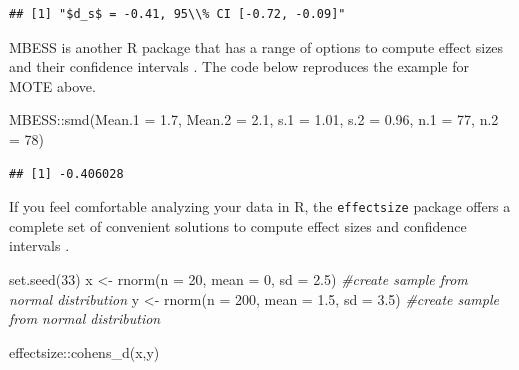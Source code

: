 \documentclass[
]{krantz}
\newenvironment{Shaded}{\begin{snugshade}}{\end{snugshade}}
\newcommand{\AttributeTok}[1]{\textcolor[rgb]{0.77,0.63,0.00}{#1}}
\newcommand{\CommentTok}[1]{\textcolor[rgb]{0.56,0.35,0.01}{\textit{#1}}}
\newcommand{\DecValTok}[1]{\textcolor[rgb]{0.00,0.00,0.81}{#1}}
\newcommand{\FloatTok}[1]{\textcolor[rgb]{0.00,0.00,0.81}{#1}}
\newcommand{\FunctionTok}[1]{\textcolor[rgb]{0.00,0.00,0.00}{#1}}
\newcommand{\NormalTok}[1]{#1}
\newcommand{\OtherTok}[1]{\textcolor[rgb]{0.56,0.35,0.01}{#1}}
\newcommand{\SpecialCharTok}[1]{\textcolor[rgb]{0.00,0.00,0.00}{#1}}
\begin{document}
\begin{Shaded}
\end{Shaded}

\begin{verbatim}
## [1] "$d_s$ = -0.41, 95\\% CI [-0.72, -0.09]"
\end{verbatim}

MBESS is another R package that has a range of options to compute effect sizes and their confidence intervals \citep{kelley_confidence_2007}. The code below reproduces the example for MOTE above.

\begin{Shaded}
\begin{Highlighting}[]
\NormalTok{MBESS}\SpecialCharTok{::}\FunctionTok{smd}\NormalTok{(}\AttributeTok{Mean.1 =} \FloatTok{1.7}\NormalTok{, }\AttributeTok{Mean.2 =} \FloatTok{2.1}\NormalTok{, }\AttributeTok{s.1 =} \FloatTok{1.01}\NormalTok{, }\AttributeTok{s.2 =} \FloatTok{0.96}\NormalTok{, }\AttributeTok{n.1 =} \DecValTok{77}\NormalTok{, }\AttributeTok{n.2 =} \DecValTok{78}\NormalTok{)}
\end{Highlighting}
\end{Shaded}

\begin{verbatim}
## [1] -0.406028
\end{verbatim}

If you feel comfortable analyzing your data in R, the \texttt{effectsize} package offers a complete set of convenient solutions to compute effect sizes and confidence intervals \citep{ben-shachar_effectsize_2020}.

\begin{Shaded}
\begin{Highlighting}[]
\FunctionTok{set.seed}\NormalTok{(}\DecValTok{33}\NormalTok{)}
\NormalTok{x }\OtherTok{\textless{}{-}} \FunctionTok{rnorm}\NormalTok{(}\AttributeTok{n =} \DecValTok{20}\NormalTok{, }\AttributeTok{mean =} \DecValTok{0}\NormalTok{, }\AttributeTok{sd =} \FloatTok{2.5}\NormalTok{) }\CommentTok{\#create sample from normal distribution}
\NormalTok{y }\OtherTok{\textless{}{-}} \FunctionTok{rnorm}\NormalTok{(}\AttributeTok{n =} \DecValTok{200}\NormalTok{, }\AttributeTok{mean =} \FloatTok{1.5}\NormalTok{, }\AttributeTok{sd =} \FloatTok{3.5}\NormalTok{) }\CommentTok{\#create sample from normal distribution}

\NormalTok{effectsize}\SpecialCharTok{::}\FunctionTok{cohens\_d}\NormalTok{(x,y)}
\end{Highlighting}
\end{Shaded}
\end{document}
